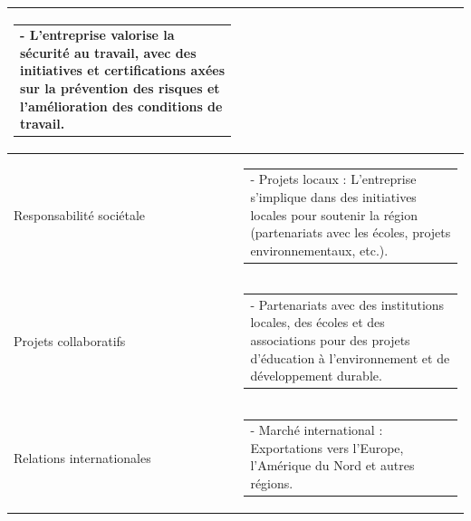 \documentclass[main.tex]{subfiles}
\begin{document}
\begin{longtable}{|p{5cm}|p{10cm}|}
\begin{tabular}[t]{@{}p{10cm}@{}}
- L’entreprise valorise la sécurité au travail, avec des initiatives et certifications axées sur la prévention des risques et l’amélioration des conditions de travail.
\end{tabular} \\
\hline
Responsabilité sociétale & \begin{tabular}[t]{@{}p{10cm}@{}}%
- Projets locaux : L’entreprise s’implique dans des initiatives locales pour soutenir la région (partenariats avec les écoles, projets environnementaux, etc.).
\end{tabular} \\
\hline
Projets collaboratifs & \begin{tabular}[t]{@{}p{10cm}@{}}%
- Partenariats avec des institutions locales, des écoles et des associations pour des projets d’éducation à l’environnement et de développement durable.
\end{tabular} \\
\hline
Relations internationales & \begin{tabular}[t]{@{}p{10cm}@{}}%
- Marché international : Exportations vers l’Europe, l’Amérique du Nord et autres régions.
\end{tabular} \\
\hline
\end{longtable}
\end{document}
